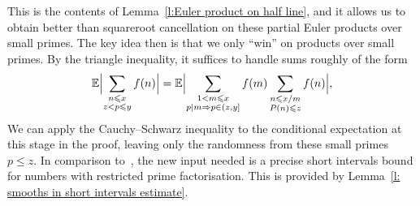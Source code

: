\documentclass[12pt,a4paper,reqno]{amsart}
\numberwithin{equation}{section}
\def\E{\mathbb E}
\def\leq {\leqslant}
\theoremstyle{remark}
\theoremstyle{definition}
\numberwithin{equation}{section}
\theoremstyle{remark}
\def\E{\mathbb E}
\begin{document}
This is the contents of Lemma~\ref{l:Euler product on half line}, and it allows us to obtain better than squareroot cancellation on these partial Euler products over small primes. The key idea then is that we only ``win'' on products over small primes. By the triangle inequality, it suffices to handle sums roughly of the form 
\[
\E \Bigl| \sum_{\substack{n \leq x \\ z < p \leq y}} f(n) \Bigr| = \E \Bigl| \sum_{\substack{1 < m \leq x \\ p | m \Rightarrow p \in (z, y]}} f(m) \sum_{\substack{n \leq x/m \\ P(n) \leq z}} f(n) \Bigr|,
\]
We can apply the Cauchy--Schwarz inequality to the conditional expectation at this stage in the proof, leaving only the randomness from these small primes $p \leq z$. In comparison to~\cite{HarperLow}, the new input needed is a precise short intervals bound for numbers with restricted prime factorisation. This is provided by Lemma~\ref{l: smooths in short intervals estimate}.
\end{document}
